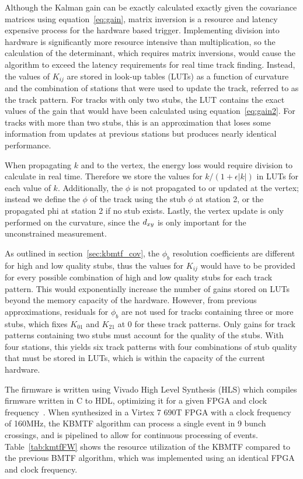 Although the Kalman gain can be exactly calculated exactly given the covariance matrices using equation~\ref{eq:gain}, matrix inversion is a resource and latency expensive process for the hardware based trigger. Implementing division into hardware is significantly more resource intensive than multiplication, so the calculation of the determinant, which requires matrix inversions, would cause the algorithm to exceed the latency requirements for real time track finding. Instead, the values of $K_{ij}$ are stored in look-up tables (LUTs) as a function of curvature and the combination of stations that were used to update the track, referred to as the track pattern. For tracks with only two stubs, the LUT contains the exact values of the gain that would have been calculated using equation~\ref{eq:gain2}. For tracks with more than two stubs, this is an approximation that loses some information from updates at previous stations but produces nearly identical performance.

When propagating $k$ and \dxy to the vertex, the energy loss would require division to calculate in real time. Therefore we store the values for $k/(1+\epsilon|k|)$ in LUTs for each value of $k$. Additionally, the $\phi$ is not propagated to or updated at the vertex; instead we define the $\phi$ of the track using the stub $\phi$ at station 2, or the propagated phi at station 2 if no stub exists. Lastly, the vertex update is only performed on the curvature, since the $d_{xy}$ is only important for the unconstrained measurement.

As outlined in section~\ref{sec:kbmtf_cov}, the $\phi_b$ resolution coefficients are different for high and low quality stubs, thus the values for $K_{ij}$ would have to be provided for every possible combination of high and low quality stubs for each track pattern. This would exponentially increase the number of gains stored on LUTs beyond the memory capacity of the hardware. However, from previous approximations, residuals for $\phi_b$ are not used for tracks containing three or more stubs, which fixes $K_{01}$ and $K_{21}$ at 0 for these track patterns. Only gains for track patterns containing two stubs must account for the quality of the stubs. With four stations, this yields six track patterns with four combinations of stub quality that must be stored in LUTs, which is within the capacity of the current hardware.

The firmware is written using Vivado High Level Synthesis (HLS) which compiles firmware written in C to HDL, optimizing it for a given FPGA and clock frequency~\cite{Bachtis:2648953}. When synthesized in a Virtex 7 690T FPGA with a clock frequency of 160\unit{MHz}, the KBMTF algorithm can process a single event in 9 bunch crossings, and is pipelined to allow for continuous processing of events. Table~\ref{tab:kmtfFW} shows the resource utilization of the KBMTF compared to the previous BMTF algorithm, which was implemented using an identical FPGA and clock frequency.

